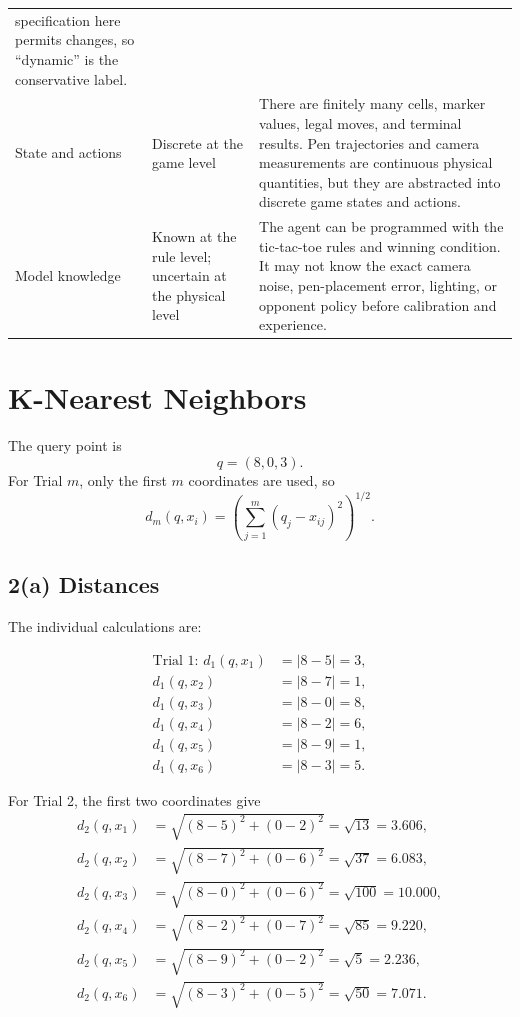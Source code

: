 \documentclass[11pt]{article}
\begin{document}
{\begin{center}
\begin{tabular}{>{\raggedright\arraybackslash}p{}
                >{\raggedright\arraybackslash}p{}
                >{\raggedright\arraybackslash}p{}}
specification here permits changes, so ``dynamic'' is the conservative label.\\
\addlinespace
State and actions & Discrete at the game level &
There are finitely many cells, marker values, legal moves, and terminal results.
Pen trajectories and camera measurements are continuous physical quantities,
but they are abstracted into discrete game states and actions.\\
\addlinespace
Model knowledge & Known at the rule level; uncertain at the physical level &
The agent can be programmed with the tic-tac-toe rules and winning condition.
It may not know the exact camera noise, pen-placement error, lighting, or
opponent policy before calibration and experience.\\
\bottomrule
\end{tabular}
\end{center}
}

\section{K-Nearest Neighbors}

The query point is
\[
q=(8,0,3).
\]
For Trial $m$, only the first $m$ coordinates are used, so
\[
d_m(q,x_i)=\left(\sum_{j=1}^{m}(q_j-x_{ij})^2\right)^{1/2}.
\]

\subsection*{2(a) Distances}
The individual calculations are:

\begin{align*}
\text{Trial 1: }d_1(q,x_1)&=|8-5|=3,\\
d_1(q,x_2)&=|8-7|=1,\\
d_1(q,x_3)&=|8-0|=8,\\
d_1(q,x_4)&=|8-2|=6,\\
d_1(q,x_5)&=|8-9|=1,\\
d_1(q,x_6)&=|8-3|=5.
\end{align*}

For Trial 2, the first two coordinates give
\begin{align*}
 d_2(q,x_1)&=\sqrt{(8-5)^2+(0-2)^2}=\sqrt{13}=3.606,\\
 d_2(q,x_2)&=\sqrt{(8-7)^2+(0-6)^2}=\sqrt{37}=6.083,\\
 d_2(q,x_3)&=\sqrt{(8-0)^2+(0-6)^2}=\sqrt{100}=10.000,\\
 d_2(q,x_4)&=\sqrt{(8-2)^2+(0-7)^2}=\sqrt{85}=9.220,\\
 d_2(q,x_5)&=\sqrt{(8-9)^2+(0-2)^2}=\sqrt{5}=2.236,\\
 d_2(q,x_6)&=\sqrt{(8-3)^2+(0-5)^2}=\sqrt{50}=7.071.
\end{align*}
\end{document}
